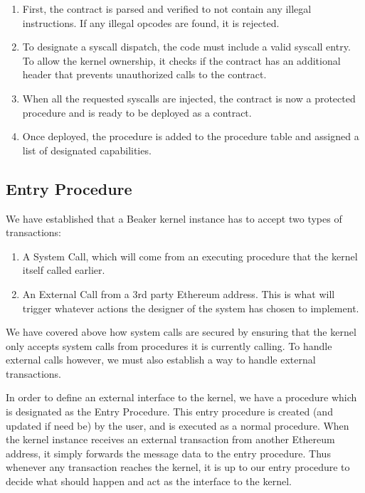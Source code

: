 \documentclass[english,a4paper]{article}
\begin{document}
\begin{enumerate}
\def\labelenumi{\arabic{enumi}.}
\item
  First, the contract is parsed and verified to not contain any illegal
  instructions. If any illegal opcodes are found, it is rejected.
\item
  To designate a syscall dispatch, the code must include a valid syscall
  entry. To allow the kernel ownership, it checks if the contract has an
  additional header that prevents unauthorized calls to the contract.
\item
  When all the requested syscalls are injected, the contract is now a
  protected procedure and is ready to be deployed as a contract.
\item
  Once deployed, the procedure is added to the procedure table and
  assigned a list of designated capabilities.
\end{enumerate}

\subsection{Entry Procedure}\label{entry-procedure}
We have established that a Beaker kernel instance has to accept two
types of transactions:

\begin{enumerate}
\def\labelenumi{\arabic{enumi}.}
\item
  A System Call, which will come from an executing procedure that the
  kernel itself called earlier.
\item
  An External Call from a 3rd party Ethereum address. This is what will
  trigger whatever actions the designer of the system has chosen to
  implement.
\end{enumerate}

We have covered above how system calls are secured by ensuring that the
kernel only accepts system calls from procedures it is currently
calling. To handle external calls however, we must also establish a way
to handle external transactions.

In order to define an external interface to the kernel, we have a
procedure which is designated as the Entry Procedure. This entry
procedure is created (and updated if need be) by the user, and is
executed as a normal procedure. When the kernel instance receives an
external transaction from another Ethereum address, it simply forwards
the message data to the entry procedure. Thus whenever any transaction
reaches the kernel, it is up to our entry procedure to decide what
should happen and act as the interface to the kernel.
\end{document}
